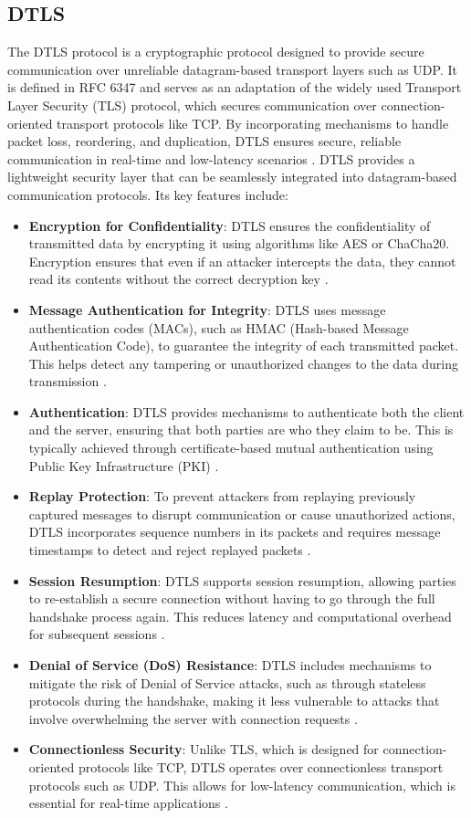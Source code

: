\documentclass[conference]{IEEEtran}
\begin{document}
\subsection{DTLS}
The DTLS protocol is a cryptographic protocol designed to provide secure communication over unreliable datagram-based 
transport layers such as UDP. It is defined in RFC 6347 and serves as an adaptation of the widely used Transport 
Layer Security (TLS) protocol, which secures communication over connection-oriented transport protocols like TCP. 
By incorporating mechanisms to handle packet loss, reordering, and duplication, DTLS ensures secure, reliable 
communication in real-time and low-latency scenarios \cite{RFC6347}.
DTLS provides a lightweight security layer that can be seamlessly integrated into datagram-based communication protocols. Its key features include:
\begin{itemize}
    \item \textbf{Encryption for Confidentiality}: DTLS ensures the confidentiality of transmitted data by encrypting it using algorithms like AES or 
    ChaCha20. Encryption ensures that even if an attacker intercepts the data, they cannot read its contents without the correct decryption key \cite{RFC6347}.
    \item \textbf{Message Authentication for Integrity}: DTLS uses message authentication codes (MACs), such as HMAC (Hash-based Message Authentication Code), 
    to guarantee the integrity of each transmitted packet. This helps detect any tampering or unauthorized changes to the data during transmission \cite{RFC6347}.
    \item \textbf{Authentication}: DTLS provides mechanisms to authenticate both the client and the server, ensuring that both parties are who they claim 
    to be. This is typically achieved through certificate-based mutual authentication using Public Key Infrastructure (PKI) \cite{RFC6347}.
    \item \textbf{Replay Protection}: To prevent attackers from replaying previously captured messages to disrupt communication or cause unauthorized actions, 
    DTLS incorporates sequence numbers in its packets and requires message timestamps to detect and reject replayed packets \cite{RFC6347}.
    \item \textbf{Session Resumption}: DTLS supports session resumption, allowing parties to re-establish a secure connection without having to go 
    through the full handshake process again. This reduces latency and computational overhead for subsequent sessions \cite{RFC6347}.
    \item \textbf{Denial of Service (DoS) Resistance}: DTLS includes mechanisms to mitigate the risk of Denial of Service attacks, such as through 
    stateless protocols during the handshake, making it less vulnerable to attacks that involve overwhelming the server with connection requests \cite{RFC6347}.
    \item \textbf{Connectionless Security}: Unlike TLS, which is designed for connection-oriented protocols like TCP, DTLS operates over connectionless 
    transport protocols such as UDP. This allows for low-latency communication, which is essential for real-time applications \cite{RFC6347}.
\end{itemize}
\end{document}
